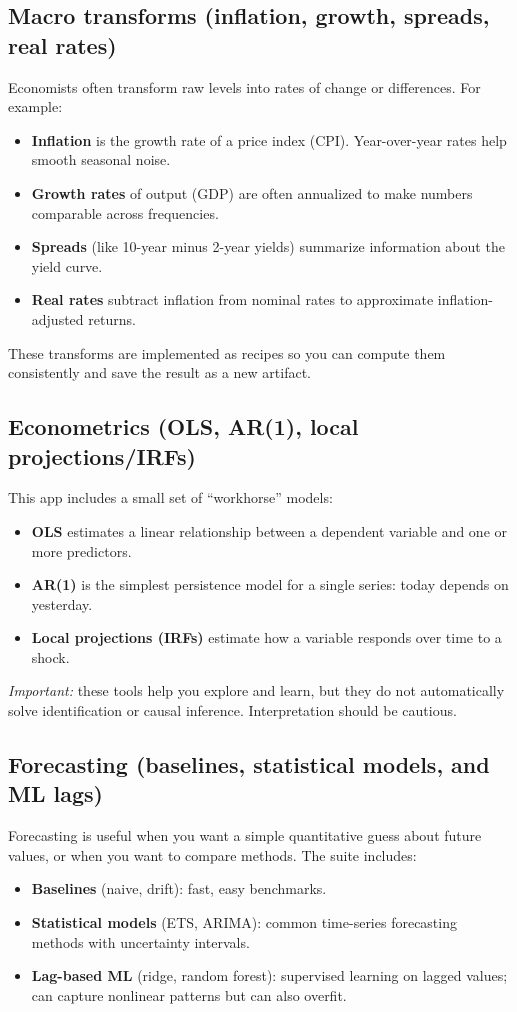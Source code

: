 \documentclass[11pt,a4paper]{article}
\begin{document}
\subsection{Macro transforms (inflation, growth, spreads, real rates)}
Economists often transform raw levels into rates of change or differences. For example:
\begin{itemize}[leftmargin=2em]
  \item \textbf{Inflation} is the growth rate of a price index (CPI). Year-over-year rates help smooth seasonal noise.
  \item \textbf{Growth rates} of output (GDP) are often annualized to make numbers comparable across frequencies.
  \item \textbf{Spreads} (like 10-year minus 2-year yields) summarize information about the yield curve.
  \item \textbf{Real rates} subtract inflation from nominal rates to approximate inflation-adjusted returns.
\end{itemize}
These transforms are implemented as recipes so you can compute them consistently and save the result as a new artifact.

\subsection{Econometrics (OLS, AR(1), local projections/IRFs)}
This app includes a small set of ``workhorse'' models:
\begin{itemize}[leftmargin=2em]
  \item \textbf{OLS} estimates a linear relationship between a dependent variable and one or more predictors.
  \item \textbf{AR(1)} is the simplest persistence model for a single series: today depends on yesterday.
  \item \textbf{Local projections (IRFs)} estimate how a variable responds over time to a shock.
\end{itemize}
\textit{Important:} these tools help you explore and learn, but they do not automatically solve identification or causal inference. Interpretation should be cautious.

\subsection{Forecasting (baselines, statistical models, and ML lags)}
Forecasting is useful when you want a simple quantitative guess about future values, or when you want to compare methods. The suite includes:
\begin{itemize}[leftmargin=2em]
  \item \textbf{Baselines} (naive, drift): fast, easy benchmarks.
  \item \textbf{Statistical models} (ETS, ARIMA): common time-series forecasting methods with uncertainty intervals.
  \item \textbf{Lag-based ML} (ridge, random forest): supervised learning on lagged values; can capture nonlinear patterns but can also overfit.
\end{itemize}
\end{document}

